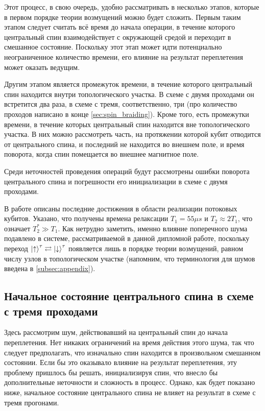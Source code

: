 \documentclass[a4paper,12pt]{article}
\theoremstyle{plain} %
\theoremstyle{definition} %
\theoremstyle{remark} %
\begin{document}
Этот процесс, в свою очередь, удобно рассматривать в несколько этапов, которые в первом порядке теории возмущений можно будет сложить. 
Первым таким этапом следует считать всё время до начала операции, в течение которого центральный спин взаимодействует с окружающей средой и переходит в смешанное состояние. 
Поскольку этот этап может идти потенциально неограниченное количество времени, его влияние на результат переплетения может оказать ведущим.

Другим этапом является промежуток времени, в течение которого центральный спин находится внутри топологического участка. 
В схеме с двумя проходами он встретится два раза, в схеме с тремя, соответственно, три (про количество проходов написано в конце \ref{sec:spin_braiding}). 
Кроме того, есть промежутки времени, в течение которых центральный спин находится вне топологического участка. 
В них можно рассмотреть часть, на протяжении которой кубит отводится от центрального спина, и последний не находится во внешнем поле, и время поворота, когда спин помещается во внешнее магнитное поле.

Среди неточностей проведения операций будут рассмотрены ошибки поворота центрального спина и погрешности его инициализации в схеме с двумя проходами.

В работе \cite{flux_qubit} описаны последние достижения в области реализации потоковых кубитов. Указано, что получены времена релаксации $T_1 = 55 \mu s$ и $T_2 \approx 2 T_1$, что означает $T_2^* \gg T_1$. Как нетрудно заметить, именно влияние поперечного шума подавлено в системе, рассматриваемой в данной дипломной работе, поскольку переход $\ket{\uparrow}^\tau \rightleftarrows \ket{\downarrow}^\tau$ появляется лишь в порядке теории возмущений, равном числу узлов в топологическом участке (напомним, что терминология для шумов введена в \ref{subsec:appendix}).

\subsection{Начальное состояние центрального спина в схеме с тремя проходами} \label{subsec:spin_init}

Здесь рассмотрим шум, действовавший на центральный спин до начала переплетения. 
Нет никаких ограничений на время действия этого шума, так что следует предполагать, что изначально спин находится в произвольном смешанном состоянии. 
Если бы это оказывало влияние на результат переплетения, эту проблему пришлось бы решать, инициализируя спин, что внесло бы дополнительные неточности и сложность в процесс. 
Однако, как будет показано ниже, начальное состояние центрального спина не влияет на результат в схеме с тремя прогонами.
\end{document}
